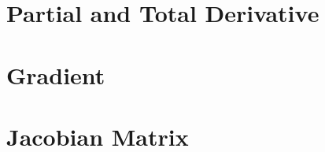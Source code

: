 \section{Partial and Total Derivative} \label{ch6sec:partialtotalderivative}

\section{Gradient} \label{ch6sec:gradient}

\section{Jacobian Matrix} \label{ch6sec:jacobianmatrix}
